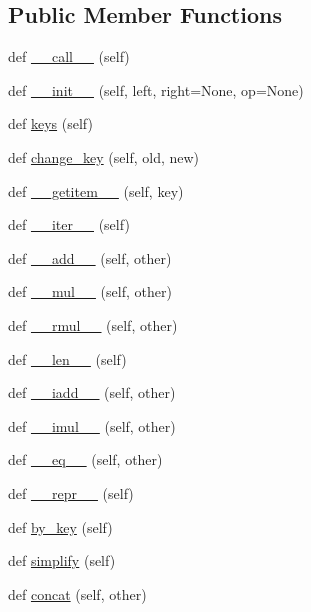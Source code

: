 \subsection*{Public Member Functions}
\begin{DoxyCompactItemize}
\item 
def \hyperlink{classcycler_1_1Cycler_a15c83d15bcbadf331a4cef7894136aa8}{\+\_\+\+\_\+call\+\_\+\+\_\+} (self)
\item 
def \hyperlink{classcycler_1_1Cycler_a3b39bffad8da36418975e7cd386db883}{\+\_\+\+\_\+init\+\_\+\+\_\+} (self, left, right=None, op=None)
\item 
def \hyperlink{classcycler_1_1Cycler_a88a3fb0b715e947bfc1c95ce83cac267}{keys} (self)
\item 
def \hyperlink{classcycler_1_1Cycler_adb8c9f43e8d31300275bf09cbce14c0a}{change\+\_\+key} (self, old, new)
\item 
def \hyperlink{classcycler_1_1Cycler_a00a0ca61bf906531f61f16030fe3a9b0}{\+\_\+\+\_\+getitem\+\_\+\+\_\+} (self, key)
\item 
def \hyperlink{classcycler_1_1Cycler_a9791a4e7220bef0833025e5ad3eae57d}{\+\_\+\+\_\+iter\+\_\+\+\_\+} (self)
\item 
def \hyperlink{classcycler_1_1Cycler_a47cf8ab7da697c444648fa1d39073788}{\+\_\+\+\_\+add\+\_\+\+\_\+} (self, other)
\item 
def \hyperlink{classcycler_1_1Cycler_ab23a068aeb44ddae0f260d477e293922}{\+\_\+\+\_\+mul\+\_\+\+\_\+} (self, other)
\item 
def \hyperlink{classcycler_1_1Cycler_a3f88390af4b592094c0a5a6bc4984eaa}{\+\_\+\+\_\+rmul\+\_\+\+\_\+} (self, other)
\item 
def \hyperlink{classcycler_1_1Cycler_a843d7e667e9d243e9a73e7c925e1cd2f}{\+\_\+\+\_\+len\+\_\+\+\_\+} (self)
\item 
def \hyperlink{classcycler_1_1Cycler_a6857266277b80ea616f7fd70a51b519a}{\+\_\+\+\_\+iadd\+\_\+\+\_\+} (self, other)
\item 
def \hyperlink{classcycler_1_1Cycler_a0cef7faf0cf5b362c426776ebca2fe3b}{\+\_\+\+\_\+imul\+\_\+\+\_\+} (self, other)
\item 
def \hyperlink{classcycler_1_1Cycler_aa01128b0081267caa56a93123fa7b645}{\+\_\+\+\_\+eq\+\_\+\+\_\+} (self, other)
\item 
def \hyperlink{classcycler_1_1Cycler_ac4312249bd1aeb949568ee49bf62971e}{\+\_\+\+\_\+repr\+\_\+\+\_\+} (self)
\item 
def \hyperlink{classcycler_1_1Cycler_aff0cddb733ac75e56fe420b00d108efd}{by\+\_\+key} (self)
\item 
def \hyperlink{classcycler_1_1Cycler_a0a6e46f7c2b2e5a277e1e8c0b43c96e5}{simplify} (self)
\item 
def \hyperlink{classcycler_1_1Cycler_a29be128842304da3f9cf41b526c6e2fe}{concat} (self, other)
\end{DoxyCompactItemize}


